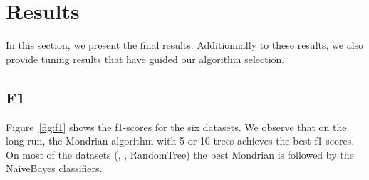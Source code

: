 \section{Results}
In this section, we present the final results. Additionnally to these results,
we also provide tuning results that have guided our algorithm selection.

\subsection{F1}
Figure~\ref{fig:f1} shows the f1-scores for the six datasets.  We
observe that on the long run, the Mondrian algorithm with 5 or 10 trees achieves
the best f1-scores.  On most of the datasets (\banosdataset, \recofitdataset,
RandomTree) the best Mondrian is followed by the NaiveBayes classifiers. 

